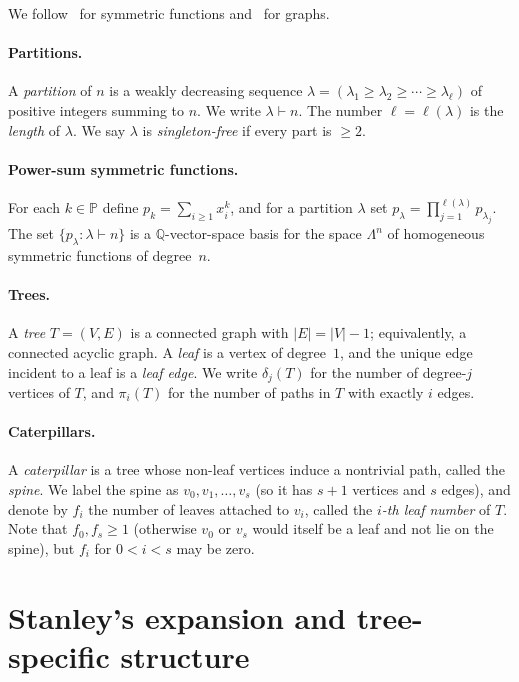 \documentclass[11pt]{article}
\theoremstyle{definition}
\newcommand{\PP}{\mathbb{P}}
\begin{document}
We follow~\cite{Macdonald,StanleyEC2} for symmetric functions
and~\cite{Bollobas} for graphs.

\paragraph{Partitions.}
A \emph{partition} of $n$ is a weakly decreasing sequence
$\lambda = (\lambda_1\geq\lambda_2\geq\cdots\geq\lambda_\ell)$ of
positive integers summing to $n$.  We write $\lambda\vdash n$.  The
number $\ell=\ell(\lambda)$ is the \emph{length} of $\lambda$.  We say
$\lambda$ is \emph{singleton-free} if every part is $\geq 2$.

\paragraph{Power-sum symmetric functions.}
For each $k\in\PP$ define $p_k = \sum_{i\geq 1} x_i^k$, and for a
partition $\lambda$ set $p_\lambda = \prod_{j=1}^{\ell(\lambda)}
p_{\lambda_j}$.  The set $\{p_\lambda : \lambda\vdash n\}$ is a
$\mathbb{Q}$-vector-space basis for the space $\Lambda^n$ of
homogeneous symmetric functions of degree~$n$.

\paragraph{Trees.}
A \emph{tree} $T=(V,E)$ is a connected graph with $|E|=|V|-1$; equivalently,
a connected acyclic graph.  A \emph{leaf} is a vertex of degree~$1$, and
the unique edge incident to a leaf is a \emph{leaf edge}.  We write
$\delta_j(T)$ for the number of degree-$j$ vertices of $T$, and
$\pi_i(T)$ for the number of paths in $T$ with exactly $i$ edges.

\paragraph{Caterpillars.}
A \emph{caterpillar} is a tree whose non-leaf vertices induce a
nontrivial path, called the \emph{spine}.  We label the spine as
$v_0,v_1,\ldots,v_s$ (so it has $s+1$ vertices and $s$ edges), and
denote by $f_i$ the number of leaves attached to $v_i$, called the
\emph{$i$-th leaf number} of $T$.  Note that $f_0,f_s\geq 1$ (otherwise
$v_0$ or $v_s$ would itself be a leaf and not lie on the spine), but
$f_i$ for $0<i<s$ may be zero.

\section{Stanley's expansion and tree-specific structure}\label{sec:expansion}
\end{document}
